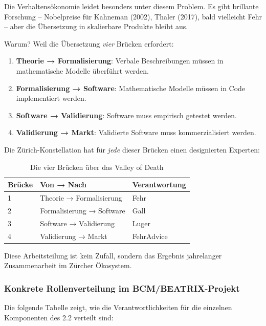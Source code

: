 Die Verhaltensökonomie leidet besonders unter diesem Problem. Es gibt brillante Forschung -- Nobelpreise für Kahneman (2002), Thaler (2017), bald vielleicht Fehr -- aber die Übersetzung in skalierbare Produkte bleibt aus.

Warum? Weil die Übersetzung \textit{vier} Brücken erfordert:

\begin{enumerate}
    \item \textbf{Theorie → Formalisierung}: Verbale Beschreibungen müssen in mathematische Modelle überführt werden.
    \item \textbf{Formalisierung → Software}: Mathematische Modelle müssen in Code implementiert werden.
    \item \textbf{Software → Validierung}: Software muss empirisch getestet werden.
    \item \textbf{Validierung → Markt}: Validierte Software muss kommerzialisiert werden.
\end{enumerate}

Die Zürich-Konstellation hat für \textit{jede} dieser Brücken einen designierten Experten:

\begin{table}[h]
\centering
\caption{Die vier Brücken über das Valley of Death}
\begin{tabular}{@{}lll@{}}
\toprule
\textbf{Brücke} & \textbf{Von → Nach} & \textbf{Verantwortung} \\
\midrule
1 & Theorie → Formalisierung & Fehr \\
2 & Formalisierung → Software & Gall \\
3 & Software → Validierung & Luger \\
4 & Validierung → Markt & FehrAdvice \\
\bottomrule
\end{tabular}
\end{table}

Diese Arbeitsteilung ist kein Zufall, sondern das Ergebnis jahrelanger Zusammenarbeit im Zürcher Ökosystem.

\subsubsection{Konkrete Rollenverteilung im BCM/BEATRIX-Projekt}

Die folgende Tabelle zeigt, wie die Verantwortlichkeiten für die einzelnen Komponenten des \BCM{} 2.2 verteilt sind:

